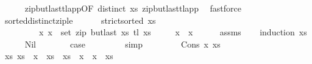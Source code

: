 \begin{isabellebody}
%
\isadelimproof
\ \ \ \ %
\endisadelimproof
%
\isatagproof
{}\isamarkupfalse%
\ zip{\isacharunderscore}{\kern0pt}butlast{\isacharunderscore}{\kern0pt}tl{\isacharunderscore}{\kern0pt}app{}{\isacharbrackleft}{\kern0pt}OF\ {\isacartoucheopen}distinct\ xs{\isacartoucheclose}{\isacharbrackright}{\kern0pt}\ zip{\isacharunderscore}{\kern0pt}butlast{\isacharunderscore}{\kern0pt}tl{\isacharunderscore}{\kern0pt}app{}\ \isamarkupfalse%
\ fastforce%
\endisatagproof
{\isafoldproof}%
%
\isadelimproof
\isanewline
%
\endisadelimproof
\isanewline
\ \ \isamarkupfalse%
\ sorted{\isacharunderscore}{\kern0pt}distinct{\isacharunderscore}{\kern0pt}zip{\isacharunderscore}{\kern0pt}le{\isacharcolon}{\kern0pt}\ \isanewline
\ \ \ \ \ {\isachardoublequoteopen}strict{\isacharunderscore}{\kern0pt}sorted\ xs{\isachardoublequoteclose}\ \isanewline
\ \ \ \ \ \ \ \ \ {\isachardoublequoteopen}{\isacharparenleft}{\kern0pt}x\ x\ {\isasymin}\ set\ {\isacharparenleft}{\kern0pt}zip\ {\isacharparenleft}{\kern0pt}butlast\ xs{\isacharparenright}{\kern0pt}\ {\isacharparenleft}{\kern0pt}tl\ xs{\isacharparenright}{\kern0pt}{\isacharparenright}{\kern0pt}{\isachardoublequoteclose}\isanewline
\ \ \ \ \ {\isachardoublequoteopen}x\ {\isacharless}{\kern0pt}\ x\isanewline
%
\isadelimproof
\ \ \ \ %
\endisadelimproof
%
\isatagproof
{}\isamarkupfalse%
\ assms\isanewline
\ \ \isamarkupfalse%
\ {\isacharparenleft}{\kern0pt}induction\ xs{\isacharparenright}{\kern0pt}\isanewline
\ \ \ \ \isamarkupfalse%
\ Nil\isanewline
\ \ \ \ \isamarkupfalse%
\ \isamarkupfalse%
\ {\isacharquery}{\kern0pt}case\ \isanewline
\ \ \ \ \ \ \isamarkupfalse%
\ simp\isanewline
\ \ \isamarkupfalse%
\isanewline
\ \ \ \ \isamarkupfalse%
\ {\isacharparenleft}{\kern0pt}Cons\ x\ xs{\isacharparenright}{\kern0pt}\isanewline
\ \ \ \ \isamarkupfalse%
\ xs\ xs\ \ {\isachardoublequoteopen}x\ {\isacharhash}{\kern0pt}\ xs\ {\isacharequal}{\kern0pt}\ xs\ {\isacharat}{\kern0pt}\ {\isacharparenleft}{\kern0pt}x\ {\isacharhash}{\kern0pt}\ x\ {\isacharhash}{\kern0pt}\ xs\isanewline

\end{isabellebody}
